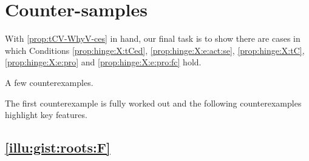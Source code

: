 \section{Counter-samples}
\label{sec:counter-samples}


\begin{note}
  With \autoref{prop:tCV-WhyV-ces} in hand, our final task is to show there are cases in which Conditions \ref{prop:hinge:X:tCed}, \ref{prop:hinge:X:e:act:se}, \ref{prop:hinge:X:tC}, \ref{prop:hinge:X:e:pro} and \ref{prop:hinge:X:e:pro:fc} hold.
\end{note}


\begin{note}
  A few counterexamples.

  The first counterexample is fully worked out and the following counterexamples highlight key features.
\end{note}



\subsection{\autoref{illu:gist:roots:F}}


